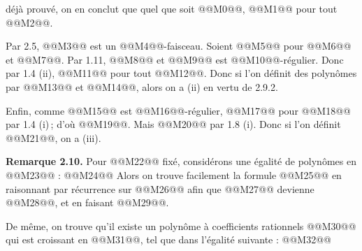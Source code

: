 
déjà
prouvé, on en conclut que quel que soit @@M0@@,
@@M1@@
pour tout @@M2@@.

Par 2.5, @@M3@@ est un @@M4@@-faisceau. Soient @@M5@@ pour @@M6@@ et @@M7@@. Par 1.11, @@M8@@ et @@M9@@ est @@M10@@-régulier. Donc par 1.4 (ii), @@M11@@ pour tout @@M12@@. Donc si l'on définit des polynômes par @@M13@@ et @@M14@@, alors on a (ii) en vertu de 2.9.2.

Enfin, comme @@M15@@ est @@M16@@-régulier, @@M17@@ pour @@M18@@ par 1.4 (i)\,; d'où @@M19@@. Mais @@M20@@ par 1.8 (i). Donc si l'on définit @@M21@@, on a (iii).

\textbf{Remarque 2.10.} Pour @@M22@@ fixé, considérons une égalité de polynômes en @@M23@@ :
@@M24@@
Alors on trouve facilement la formule
@@M25@@
en raisonnant par récurrence sur @@M26@@ afin que @@M27@@ devienne @@M28@@, et en faisant @@M29@@.

De même, on trouve qu'il existe un polynôme à coefficients rationnels @@M30@@ qui est croissant en @@M31@@, tel que dans l'égalité suivante :
@@M32@@
